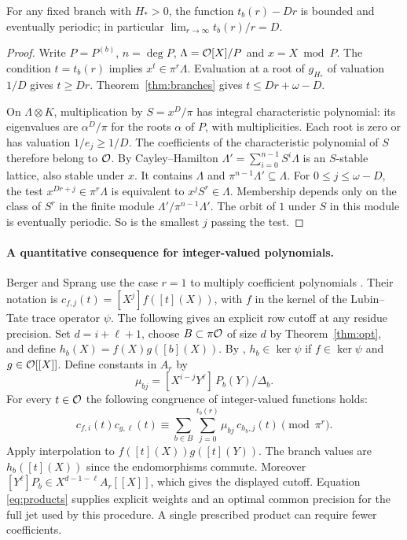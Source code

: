 \begin{proposition}\label{prop:period}
For any fixed branch with $H_*>0$, the function $t_b(r)-Dr$ is bounded and eventually periodic; in particular $\lim_{r\to\infty}t_b(r)/r=D$.
\end{proposition}
\begin{proof}
Write $P=P^{(b)}$, $n=\deg P$, $\Lambda=\mathcal O[X]/P$ and $x=X\bmod P$. The condition $t=t_b(r)$ implies $x^t\in\pi^r\Lambda$. Evaluation at a root of $g_{H_*}$ of valuation $1/D$ gives $t\ge Dr$. Theorem~\ref{thm:branches} gives $t\le Dr+\omega-D$.

On $\Lambda\otimes K$, multiplication by $S=x^D/\pi$ has integral characteristic polynomial: its eigenvalues are $\alpha^D/\pi$ for the roots $\alpha$ of $P$, with multiplicities. Each root is zero or has valuation $1/e_j\ge1/D$. The coefficients of the characteristic polynomial of $S$ therefore belong to $\mathcal O$. By Cayley--Hamilton $\Lambda'=\sum_{i=0}^{n-1} S^i\Lambda$ is an $S$-stable lattice, also stable under $x$. It contains $\Lambda$ and $\pi^{n-1}\Lambda'\subseteq\Lambda$. For $0\le j\le\omega-D$, the test $x^{Dr+j}\in\pi^r\Lambda$ is equivalent to $x^j S^r\in\Lambda$. Membership depends only on the class of $S^r$ in the finite module $\Lambda'/\pi^{n-1}\Lambda'$. The orbit of $1$ under $S$ in this module is eventually periodic. So is the smallest $j$ passing the test.
\end{proof}

\paragraph{A quantitative consequence for integer-valued polynomials.}
Berger and Sprang use the case $r=1$ to multiply coefficient polynomials \cite[Theorem 4.6]{bs}. Their notation is $c_{f,j}(t)=[X^j]f([t](X))$, with $f$ in the kernel of the Lubin--Tate trace operator $\psi$. The following gives an explicit row cutoff at any residue precision. Set $d=i+\ell+1$, choose $B\subset\pi\mathcal O$ of size $d$ by Theorem~\ref{thm:opt}, and define $h_b(X)=f(X)g([b](X))$. By \cite[Lemma 4.5]{bs}, $h_b\in\ker\psi$ if $f\in\ker\psi$ and $g\in\mathcal O[[X]]$. Define constants in $A_r$ by
\[
       \mu_{bj}=[X^{i-j}Y^\ell]\,P_b(Y)/\Delta_b .
\]
For every $t\in\mathcal O$ the following congruence of integer-valued functions holds:
\begin{equation}
 c_{f,i}(t)c_{g,\ell}(t)\equiv
 \sum_{b\in B}\sum_{j=0}^{t_b(r)}\mu_{bj}\,c_{h_b,j}(t)\pmod{\pi^r}.
 \label{eq:products}
\end{equation}
Apply interpolation to $f([t](X))g([t](Y))$. The branch values are $h_b([t](X))$ since the endomorphisms commute. Moreover $[Y^\ell]P_b\in X^{d-1-\ell}A_r[[X]]$, which gives the displayed cutoff. Equation \eqref{eq:products} supplies explicit weights and an optimal common precision for the full jet used by this procedure. A single prescribed product can require fewer coefficients.
